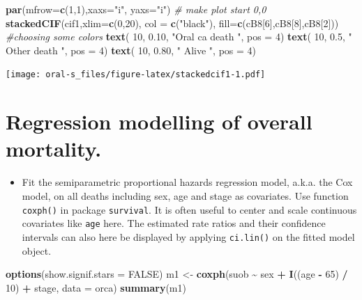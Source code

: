 \documentclass[
]{book}
\newenvironment{Shaded}{\begin{snugshade}}{\end{snugshade}}
\newcommand{\AttributeTok}[1]{\textcolor[rgb]{0.13,0.29,0.53}{#1}}
\newcommand{\CommentTok}[1]{\textcolor[rgb]{0.56,0.35,0.01}{\textit{#1}}}
\newcommand{\ConstantTok}[1]{\textcolor[rgb]{0.56,0.35,0.01}{#1}}
\newcommand{\DecValTok}[1]{\textcolor[rgb]{0.00,0.00,0.81}{#1}}
\newcommand{\FloatTok}[1]{\textcolor[rgb]{0.00,0.00,0.81}{#1}}
\newcommand{\FunctionTok}[1]{\textcolor[rgb]{0.13,0.29,0.53}{\textbf{#1}}}
\newcommand{\NormalTok}[1]{#1}
\newcommand{\OtherTok}[1]{\textcolor[rgb]{0.56,0.35,0.01}{#1}}
\newcommand{\SpecialCharTok}[1]{\textcolor[rgb]{0.81,0.36,0.00}{\textbf{#1}}}
\newcommand{\StringTok}[1]{\textcolor[rgb]{0.31,0.60,0.02}{#1}}
\providecommand{\tightlist}{%
  \setlength{\itemsep}{0pt}\setlength{\parskip}{0pt}}
\begin{document}
\begin{Shaded}
\begin{Highlighting}[]
\FunctionTok{par}\NormalTok{(}\AttributeTok{mfrow=}\FunctionTok{c}\NormalTok{(}\DecValTok{1}\NormalTok{,}\DecValTok{1}\NormalTok{),}\AttributeTok{xaxs=}\StringTok{"i"}\NormalTok{, }\AttributeTok{yaxs=}\StringTok{"i"}\NormalTok{) }\CommentTok{\# make plot start 0,0}
\FunctionTok{stackedCIF}\NormalTok{(cif1,}\AttributeTok{xlim=}\FunctionTok{c}\NormalTok{(}\DecValTok{0}\NormalTok{,}\DecValTok{20}\NormalTok{),}
           \AttributeTok{col =} \FunctionTok{c}\NormalTok{(}\StringTok{"black"}\NormalTok{),}
           \AttributeTok{fill=}\FunctionTok{c}\NormalTok{(cB8[}\DecValTok{6}\NormalTok{],cB8[}\DecValTok{8}\NormalTok{],cB8[}\DecValTok{2}\NormalTok{])) }\CommentTok{\#choosing some colors }
\FunctionTok{text}\NormalTok{( }\DecValTok{10}\NormalTok{, }\FloatTok{0.10}\NormalTok{, }\StringTok{"Oral ca death "}\NormalTok{, }\AttributeTok{pos =} \DecValTok{4}\NormalTok{)}
\FunctionTok{text}\NormalTok{( }\DecValTok{10}\NormalTok{, }\FloatTok{0.5}\NormalTok{, }\StringTok{" Other death "}\NormalTok{, }\AttributeTok{pos =} \DecValTok{4}\NormalTok{)}
\FunctionTok{text}\NormalTok{( }\DecValTok{10}\NormalTok{, }\FloatTok{0.80}\NormalTok{, }\StringTok{" Alive "}\NormalTok{, }\AttributeTok{pos =} \DecValTok{4}\NormalTok{)}
\end{Highlighting}
\end{Shaded}

\texttt{[image: oral-s\_files/figure-latex/stackedcif1-1.pdf]}

\section{Regression modelling of overall mortality.}\label{regression-modelling-of-overall-mortality.}

\begin{itemize}
\tightlist
\item
  Fit the semiparametric proportional hazards
  regression model, a.k.a. the Cox model, on all deaths including
  sex, age and stage as covariates. Use function
  \texttt{coxph()} in package \texttt{survival}.
  It is often useful to center and scale
  continuous covariates like \texttt{age} here.
  The estimated rate ratios and their confidence intervals
  can also here be displayed by applying \texttt{ci.lin()}
  on the fitted model object.
\end{itemize}

\begin{Shaded}
\begin{Highlighting}[]
\FunctionTok{options}\NormalTok{(}\AttributeTok{show.signif.stars =} \ConstantTok{FALSE}\NormalTok{)}
\NormalTok{m1 }\OtherTok{\textless{}{-}} \FunctionTok{coxph}\NormalTok{(suob }\SpecialCharTok{\textasciitilde{}}\NormalTok{ sex }\SpecialCharTok{+} \FunctionTok{I}\NormalTok{((age }\SpecialCharTok{{-}} \DecValTok{65}\NormalTok{) }\SpecialCharTok{/} \DecValTok{10}\NormalTok{) }\SpecialCharTok{+}\NormalTok{ stage, }\AttributeTok{data =}\NormalTok{ orca)}
\FunctionTok{summary}\NormalTok{(m1)}
\end{Highlighting}
\end{Shaded}
\end{document}
